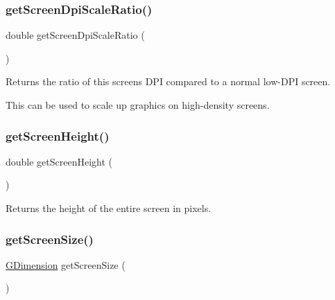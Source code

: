 \subsubsection{\texorpdfstring{get\+Screen\+Dpi\+Scale\+Ratio()}{getScreenDpiScaleRatio()}}
{\footnotesize\ttfamily double get\+Screen\+Dpi\+Scale\+Ratio (\begin{DoxyParamCaption}{ }\end{DoxyParamCaption})\hspace{0.3cm}{\ttfamily [static]}}



Returns the ratio of this screen\textquotesingle{}s D\+PI compared to a normal low-\/\+D\+PI screen. 

This can be used to scale up graphics on high-\/density screens. \mbox{\label{classGWindow_a9942379fdf4fb4445c35eaf3390b7ccb}} 
\subsubsection{\texorpdfstring{get\+Screen\+Height()}{getScreenHeight()}}
{\footnotesize\ttfamily double get\+Screen\+Height (\begin{DoxyParamCaption}{ }\end{DoxyParamCaption})\hspace{0.3cm}{\ttfamily [static]}}



Returns the height of the entire screen in pixels. 

\mbox{\label{classGWindow_ae3d08d5cde8163274459797770596809}} 
\subsubsection{\texorpdfstring{get\+Screen\+Size()}{getScreenSize()}}
{\footnotesize\ttfamily \mbox{\hyperlink{classGDimension}{G\+Dimension}} get\+Screen\+Size (\begin{DoxyParamCaption}{ }\end{DoxyParamCaption})\hspace{0.3cm}{\ttfamily [static]}}



